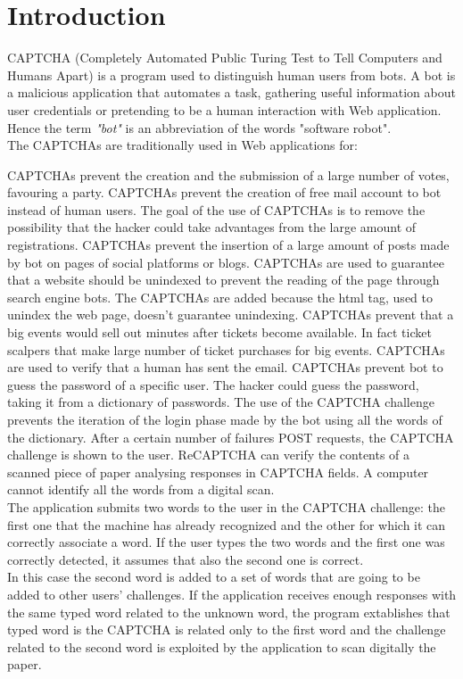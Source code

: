 \chapter{Introduction}
CAPTCHA (Completely Automated Public Turing Test to Tell Computers and Humans Apart) is a program used to distinguish human users from bots. A bot is a malicious application that automates a task, gathering useful information about user credentials or pretending to be a human interaction with Web application. Hence the term \textit{"bot"} is an abbreviation of the words "software robot".\\
The CAPTCHAs are traditionally used in Web applications for\cite{text_audio}:
\begin{itemize}
{CAPTCHAs prevent the creation and the submission of a large number of votes, favouring a party.}
{CAPTCHAs prevent the creation of free mail account to bot instead of human users. The goal of the use of CAPTCHAs is to remove the possibility that the hacker could take advantages from the large amount of registrations.}
{CAPTCHAs prevent the insertion of a large amount of posts made by bot on pages of social platforms or blogs.}
{CAPTCHAs are used to guarantee that a website should be unindexed to prevent the reading of the page through search engine bots. The CAPTCHAs are added because the html tag, used to unindex the web page, doesn't guarantee unindexing.}
{CAPTCHAs prevent that a big events would sell out minutes after tickets become available. In fact ticket scalpers that make large number of ticket purchases for big events.}
{CAPTCHAs are used to verify that a human has sent the email.}
{CAPTCHAs prevent bot to guess the password of a specific user. The hacker could guess the password, taking it from a dictionary of passwords. The use of the CAPTCHA challenge prevents the iteration of the login phase made by the bot using all the words of the dictionary. After a certain number of failures POST requests, the CAPTCHA challenge is shown to the user.}
{ReCAPTCHA can verify the contents of a scanned piece of paper analysing responses in CAPTCHA fields. A computer cannot identify all the words from a digital scan.\\
The application submits two words to the user in the CAPTCHA challenge: the first one that the machine has already recognized and the other for which it can correctly associate a word. If the user types the two words and the first one was correctly detected, it assumes that also the second one is correct.\\
In this case the second word is added to a set of words that are going to be added to other users' challenges. If the application receives enough responses with the same typed word related to the unknown word, the program extablishes that typed word is the CAPTCHA is related only to the first word and the challenge related to the second word is exploited by the application to scan digitally the paper.}
\end{itemize}
